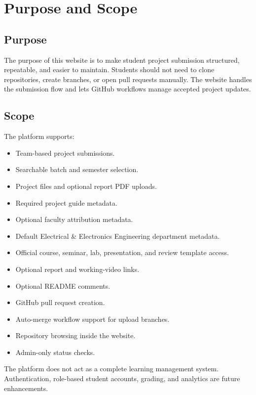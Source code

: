 \documentclass[12pt,a4paper]{article}
\begin{document}
\section{Purpose and Scope}

\subsection{Purpose}

The purpose of this website is to make student project submission structured, repeatable, and easier to maintain. Students should not need to clone repositories, create branches, or open pull requests manually. The website handles the submission flow and lets GitHub workflows manage accepted project updates.

\subsection{Scope}

The platform supports:

\begin{itemize}[leftmargin=*]
    \item Team-based project submissions.
    \item Searchable batch and semester selection.
    \item Project files and optional report PDF uploads.
    \item Required project guide metadata.
    \item Optional faculty attribution metadata.
    \item Default Electrical \& Electronics Engineering department metadata.
    \item Official course, seminar, lab, presentation, and review template access.
    \item Optional report and working-video links.
    \item Optional README comments.
    \item GitHub pull request creation.
    \item Auto-merge workflow support for upload branches.
    \item Repository browsing inside the website.
    \item Admin-only status checks.
\end{itemize}

The platform does not act as a complete learning management system. Authentication, role-based student accounts, grading, and analytics are future enhancements.
\end{document}
